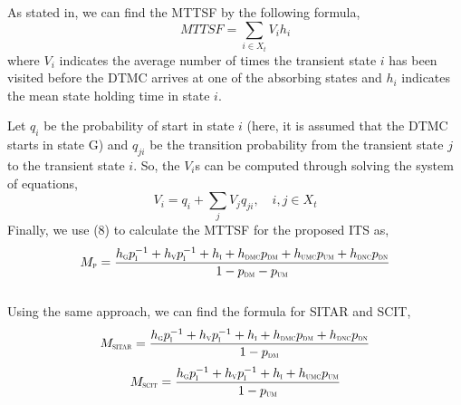 \documentclass[preprint,number,12pt]{elsarticle}
\begin{document}
As stated in\citep{Madan2004167}, we can find the MTTSF by the following formula,
\begin{equation}  \label{eq: 8}
MTTSF=  \sum_{i \in X_t} V_{i}h_{i}
\end{equation}
where $V_{i}$ indicates the average number of times the transient state $i$ has been visited before the DTMC arrives at one of the absorbing states and $h_{i}$ indicates the mean state holding time in state $i$.

Let $q_i$ be the probability of start in state $i$ (here, it is assumed that the DTMC starts in state G) and  $q_{ji}$  be the transition probability from the transient state $j$ to the transient state $i$. So, the $V_i$s can be computed through solving the system of equations,
\begin{equation}  \label{eq: system of equations}
V_i = q_i + \sum_{j} V_j q_{ji}, \quad i, j \in X_t
\end{equation}
Finally, we use (8) to calculate the MTTSF for the proposed ITS as,
\begin{equation}  \label{eq: proposed ITS MTTSF}
M_{\scalebox{0.5}{P}}=
\frac{h_{\scalebox{0.5}{G}}p_{\scalebox{0.5}{I}}^{-1}+h_{\scalebox{0.5}{V}}p_{\scalebox{0.5}{I}}^{-1}+h_{\scalebox{0.5}{I}}+h_{\scalebox{0.5}{DMC}}p_{\scalebox{0.5}{DM}}+h_{\scalebox{0.5}{UMC}}p_{\scalebox{0.5}{UM}}+h_{\scalebox{0.5}{DNC}}p_{\scalebox{0.5}{DN}}}{1-p_{\scalebox{0.5}{DM}}-p_{\scalebox{0.5}{UM}}}
\end{equation}\\
Using the same approach, we can find the formula for SITAR\citep{Madan2004167} and SCIT,
\begin{equation}  \label{eq: SITAR MTTSF}
M_{\scalebox{0.5}{SITAR}}=\frac{h_{\scalebox{0.5}{G}}p_{\scalebox{0.5}{I}}^{-1}+h_{\scalebox{0.5}{V}}p_{\scalebox{0.5}{I}}^{-1}+h_{\scalebox{0.5}{I}}+
 h_{\scalebox{0.5}{DMC}}p_{\scalebox{0.5}{DM}}+h_{\scalebox{0.5}{DNC}}p_{\scalebox{0.5}{DN}}}{1-p_{\scalebox{0.5}{DM}}}
\end{equation}
\begin{equation}  \label{eq: SCIT MTTSF}
M_{\scalebox{0.5}{SCIT}}  =\frac{h_{\scalebox{0.5}{G}}p_{\scalebox{0.5}{I}}^{-1}+h_{\scalebox{0.5}{V}}p_{\scalebox{0.5}{I}}^{-1}+h_{\scalebox{0.5}{I}}+h_{\scalebox{0.5}{UMC}}p_{\scalebox{0.5}{UM}}}{1-p_{\scalebox{0.5}{UM}}}
\end{equation}
\end{document}
